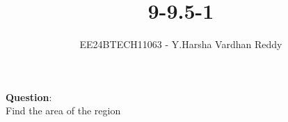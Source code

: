 \documentclass[journal]{IEEEtran}
\begin{document}

\vspace{3cm}

\title{9-9.5-1}
\author{EE24BTECH11063 - Y.Harsha Vardhan Reddy}
{\let\newpage\relax\maketitle}

\renewcommand{\thefigure}{\theenumi}
\renewcommand{\thetable}{\theenumi}
\setlength{\intextsep}{10pt} %


\renewcommand{\thetable}{\theenumi}
\textbf{Question}:\\
Find the area of the region 
\end{document}
